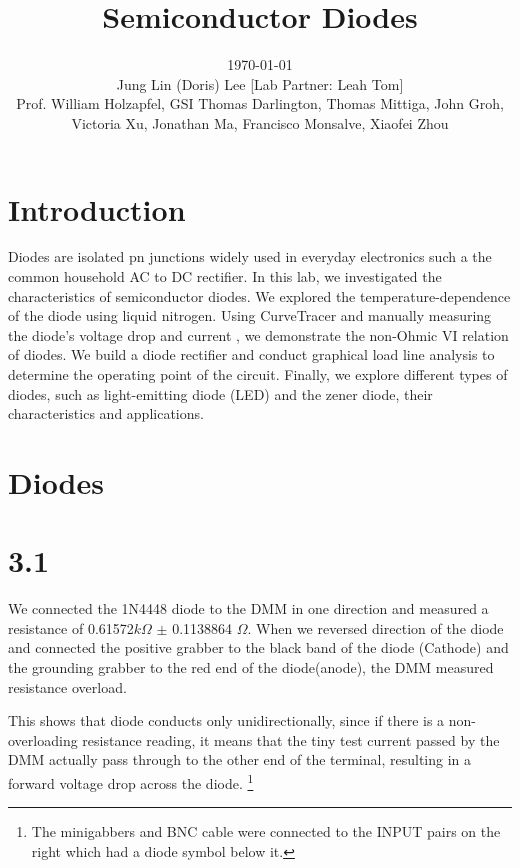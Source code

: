 \documentclass[authoryear, 12pt,5p, times]{elsarticle}
\begin{document}
\begin{frontmatter}
\title{Semiconductor Diodes}
\author{\today \quad \\Jung Lin (Doris) Lee [Lab Partner: Leah Tom]\\Prof. William Holzapfel, GSI Thomas Darlington, Thomas Mittiga, John Groh,  \\Victoria Xu, Jonathan Ma, Francisco Monsalve, Xiaofei Zhou\vspace{-30pt}}	 
\end{frontmatter}
\section*{Introduction\label{intro}}
Diodes are isolated pn junctions widely used in everyday electronics such a the common household AC to DC rectifier.
In this lab, we investigated the characteristics of semiconductor diodes. We explored the temperature-dependence of the diode using liquid nitrogen. Using CurveTracer and manually measuring the diode's voltage drop and current , we demonstrate the non-Ohmic VI relation of diodes. We build a diode rectifier and  conduct graphical load line analysis to determine the operating point of the circuit. Finally, we explore different types of diodes, such as light-emitting diode (LED) and the zener diode, their characteristics and applications. 
\section{Diodes}
\section*{3.1}
We connected the 1N4448 diode to the DMM in one direction and measured a resistance of 0.61572$k\Omega$ $\pm$ 0.1138864 $\Omega$. When we reversed direction of the diode and connected the positive grabber to the black band of the diode (Cathode) and the grounding grabber to the red end of the diode(anode), the DMM measured resistance overload. 
\par This shows that diode conducts only unidirectionally, since if there is a non-overloading resistance reading, it means that the tiny test current passed by the DMM actually pass through to the other end of the terminal, resulting in a forward voltage drop across the diode.
\footnote{The minigabbers and BNC cable were connected to the INPUT pairs on the right which had a diode symbol below it.}
\end{document}
